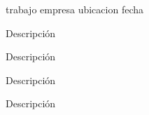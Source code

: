 

\begin{cventries}

  \cventry
    {trabajo} %
    {empresa} %
    {ubicacion} %
    {fecha} %
    {
      \begin{cvitems} %
        \item {Descripción}
        \item {Descripción}
        \item {Descripción}
         \item {Descripción}
      \end{cvitems}
    }


\end{cventries}

